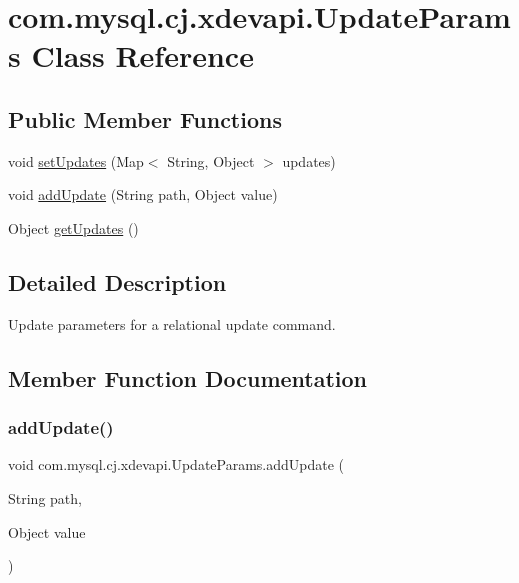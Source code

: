 \hypertarget{classcom_1_1mysql_1_1cj_1_1xdevapi_1_1_update_params}{}\section{com.\+mysql.\+cj.\+xdevapi.\+Update\+Params Class Reference}
\label{classcom_1_1mysql_1_1cj_1_1xdevapi_1_1_update_params}
\subsection*{Public Member Functions}
\begin{DoxyCompactItemize}
\item 
void \mbox{\hyperlink{classcom_1_1mysql_1_1cj_1_1xdevapi_1_1_update_params_a10b7500218727edfcb8299e07183b2e1}{set\+Updates}} (Map$<$ String, Object $>$ updates)
\item 
void \mbox{\hyperlink{classcom_1_1mysql_1_1cj_1_1xdevapi_1_1_update_params_a5ecd2bc752f6889166a59f76fea05b28}{add\+Update}} (String path, Object value)
\item 
Object \mbox{\hyperlink{classcom_1_1mysql_1_1cj_1_1xdevapi_1_1_update_params_a57dc42d6ed345654f4bcb7769fe584dc}{get\+Updates}} ()
\end{DoxyCompactItemize}


\subsection{Detailed Description}
Update parameters for a relational update command. 

\subsection{Member Function Documentation}
\mbox{\label{classcom_1_1mysql_1_1cj_1_1xdevapi_1_1_update_params_a5ecd2bc752f6889166a59f76fea05b28}} 
\subsubsection{\texorpdfstring{add\+Update()}{addUpdate()}}
{\footnotesize\ttfamily void com.\+mysql.\+cj.\+xdevapi.\+Update\+Params.\+add\+Update (\begin{DoxyParamCaption}\item[{String}]{path,  }\item[{Object}]{value }\end{DoxyParamCaption})}

